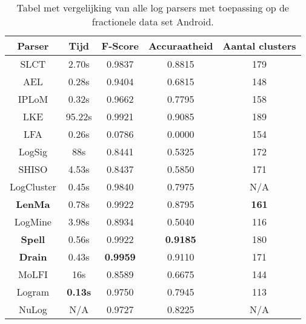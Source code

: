 \begin{table}[!hbtp]
    \caption{Tabel met vergelijking van alle log parsers met toepassing op de fractionele data set Android.}
    \label{table:Android}
    \begin{center}
        \begin{tabular}{||c | c | c | c | c||} 
            \hline
            Parser & Tijd & F-Score & Accuraatheid & Aantal clusters \\ [0.5ex] 
            \hline\hline
            SLCT & 2.70s & 0.9837 & 0.8815 & 179 \\
            
            AEL & 0.28s & 0.9404 & 0.6815 & 148 \\ 
            
            IPLoM & 0.32s & 0.9662 & 0.7795 & 158 \\
            
            LKE & 95.22s & 0.9921 & 0.9085 & 189 \\
            
            LFA & 0.26s & 0.0786 & 0.0000 & 154 \\
            
            LogSig & 88s & 0.8441 & 0.5325 & 172 \\
            
            SHISO & 4.53s & 0.8437 & 0.5850 & 171 \\
            
            LogCluster & 0.45s & 0.9840 & 0.7975 & N/A \\
            
            \textbf{LenMa} & 0.78s & 0.9922 & 0.8795 & \textbf{161} \\
            
            LogMine & 3.98s & 0.8934 & 0.5040 & 116 \\
            
            \textbf{Spell} & 0.56s & 0.9922 & \textbf{0.9185} & 180 \\
            
            \textbf{Drain} & 0.43s & \textbf{0.9959} & 0.9110 & 171 \\
            
            MoLFI & 16s & 0.8589 & 0.6675 & 144 \\
            
            Logram & \textbf{0.13s} & 0.9750 & 0.7945 & 113 \\
            
            NuLog & N/A & 0.9727 & 0.8225 & N/A \\
            \hline
        \end{tabular}
    \end{center}
\end{table}


